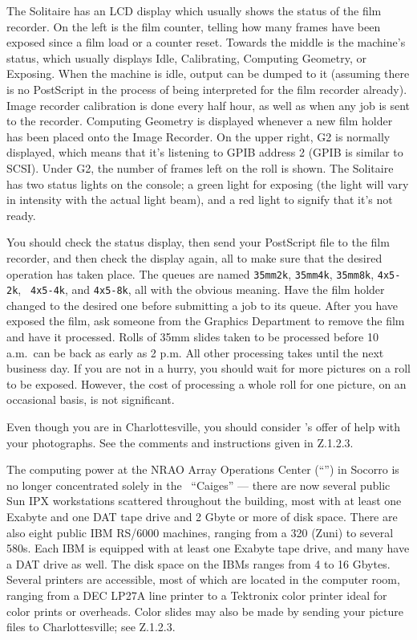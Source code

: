      The Solitaire has an LCD display which usually shows the status
of the film recorder.  On the left is the film counter, telling how
many frames have been exposed since a film load or a counter reset.
Towards the middle is the machine's status, which usually displays
Idle, Calibrating, Computing Geometry, or Exposing.  When the machine
is idle, output can be dumped to it (assuming there is no PostScript
in the process of being interpreted for the film recorder already).
Image recorder calibration is done every half hour, as well as when
any job is sent to the recorder.  Computing Geometry is displayed
whenever a new film holder has been placed onto the Image Recorder.
On the upper right, G2 is normally displayed, which means that it's
listening to GPIB address 2 (GPIB is similar to SCSI).  Under G2, the
number of frames left on the roll is shown.  The Solitaire has two
status lights on the console; a green light for exposing (the light
will vary in intensity with the actual light beam), and a red light to
signify that it's not ready.

     You should check the status display, then send your PostScript
file to the film recorder, and then check the display again, all to
make sure that the desired operation has taken place.  The queues are
named {\tt 35mm2k}, {\tt 35mm4k}, {\tt 35mm8k}, {\tt 4x5-2k}, {\tt
4x5-4k}, and {\tt 4x5-8k}, all with the obvious meaning.  Have the
film holder changed to the desired one before submitting a job to its
queue.  After you have exposed the film, ask someone from the Graphics
Department to remove the film and have it processed.  Rolls of 35mm
slides taken to be processed before 10 a.m.~can be back as early as 2
p.m.  All other processing takes until the next business day.  If you
are not in a hurry, you should wait for more pictures on a roll to be
exposed.  However, the cost of processing a whole roll for one
picture, on an occasional basis, is not significant.

     Even though you are in Charlottesville, you should consider
's offer of help with your photographs.  See the
comments and instructions given in \Sec Z.1.2.3.

\vfill\eject


   The computing power at the NRAO Array Operations Center
(``'') in Socorro is no longer concentrated solely in the
\AIPS\ ``Caiges'' --- there are now several public Sun IPX
workstations scattered throughout the building, most with at least one
Exabyte and one DAT tape drive and 2 Gbyte or more of disk space.
There are also eight public IBM RS/6000 machines, ranging from a 320
(Zuni) to several 580s.  Each IBM is equipped with at least one
Exabyte tape drive, and many have a DAT drive as well.  The disk space
on the IBMs ranges from 4 to 16 Gbytes.  Several printers are
accessible, most of which are located in the computer room, ranging
from a DEC LP27A line printer to a Tektronix color printer ideal for
color prints or overheads.  Color slides may also be made by sending
your picture files to Charlottesville; see \Sec Z.1.2.3.

